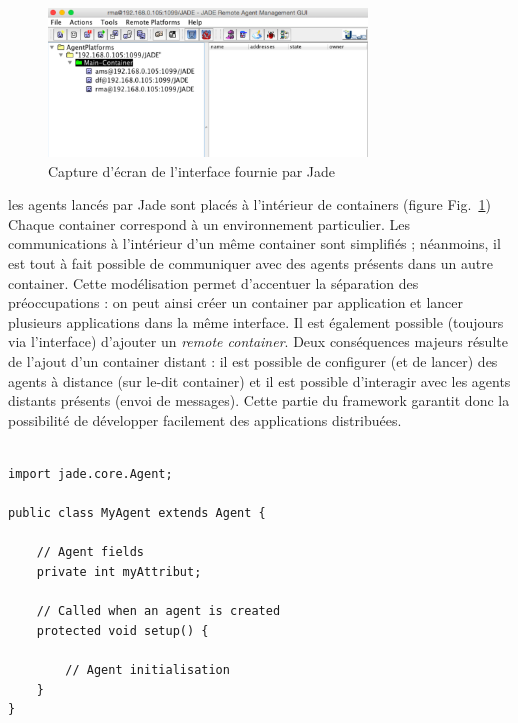 \documentclass[conference]{IEEEtran}
\begin{document}
\begin{figure}[h]
\centering
\includegraphics[width=240pt]{images/jade.png}
\caption{Capture d'écran de l'interface fournie par Jade}
\label{fig:jade}
\end{figure}

les agents lancés par Jade sont placés à l'intérieur de containers (figure Fig.~\ref{fig:jade}) Chaque container correspond à un environnement particulier. Les communications à l'intérieur d'un même container sont simplifiés ; néanmoins, il est tout à fait possible de communiquer avec des agents présents dans un autre container. Cette modélisation permet d'accentuer la séparation des préoccupations : on peut ainsi créer un container par application et lancer plusieurs applications dans la même interface. Il est également possible (toujours via l'interface) d'ajouter un \textit{remote container}. Deux conséquences majeurs résulte de l'ajout d'un container distant : il est possible de configurer (et de lancer) des agents à distance (sur le-dit container) et il est possible d'interagir avec les agents distants présents (envoi de messages). Cette partie du framework garantit donc la possibilité de développer facilement des applications distribuées.\\

\begin{lstlisting}[caption=Création d'un agent, label=lst:agent, float=t]

import jade.core.Agent;

public class MyAgent extends Agent {

    // Agent fields
    private int myAttribut;
    
    // Called when an agent is created
    protected void setup() {
    
        // Agent initialisation
    }    
}
\end{lstlisting}
\end{document}
